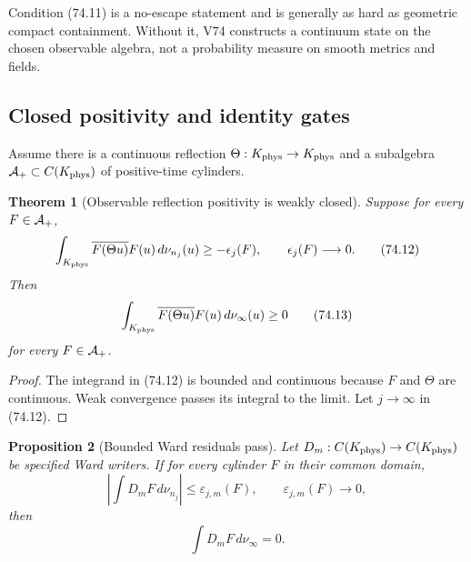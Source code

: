 \documentclass[11pt]{article}
\newtheorem{theorem}{Theorem}[section]
\newtheorem{proposition}[theorem]{Proposition}
\theoremstyle{remark}
\begin{document}
Condition (74.11) is a no-escape statement and is generally as hard
as geometric compact containment.  Without it, V74 constructs a
continuum state on the chosen observable algebra, not a probability
measure on smooth metrics and fields.

\subsection{Closed positivity and identity gates}

Assume there is a continuous reflection
\(\Theta:K_{\rm phys}\to K_{\rm phys}\) and a subalgebra
\({\cal A}_+\subset C(K_{\rm phys})\) of positive-time cylinders.

\begin{theorem}[Observable reflection positivity is weakly closed]
\label{thm:v12v74-OS}
Suppose for every \(F\in{\cal A}_+\),
\begin{equation}
 \int_{K_{\rm phys}}
 \overline{F(\Theta u)}F(u)\,d\nu_{n_j}(u)
 \geq-\epsilon_j(F),\qquad
 \epsilon_j(F)\longrightarrow0.                             \tag{74.12}
\end{equation}
Then
\begin{equation}
 \int_{K_{\rm phys}}
 \overline{F(\Theta u)}F(u)\,d\nu_\infty(u)\geq0             \tag{74.13}
\end{equation}
for every \(F\in{\cal A}_+\).
\end{theorem}

\begin{proof}
The integrand in (74.12) is bounded and continuous because \(F\)
and \(\Theta\) are continuous.  Weak convergence passes its integral
to the limit.  Let \(j\to\infty\) in (74.12).
\end{proof}

\begin{proposition}[Bounded Ward residuals pass]
\label{prop:v12v74-Ward}
Let \(D_m:C(K_{\rm phys})\to C(K_{\rm phys})\) be specified Ward
writers.  If for every cylinder \(F\) in their common domain,
\begin{equation}
 \left|\int D_mF\,d\nu_{n_j}\right|
 \leq\varepsilon_{j,m}(F),\qquad
 \varepsilon_{j,m}(F)\longrightarrow0,                      \tag{74.14}
\end{equation}
then
\begin{equation}
                         \int D_mF\,d\nu_\infty=0.            \tag{74.15}
\end{equation}
\end{proposition}
\end{document}
